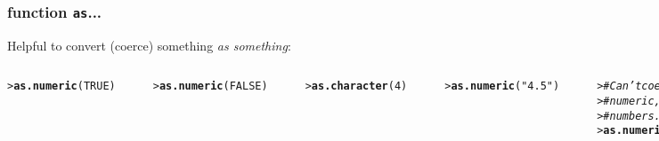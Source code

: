 \documentclass[13pt,aspectratio=169]{beamer}\usepackage[]{graphicx}\usepackage[]{color}
\makeatletter
\newcommand{\hlnum}[1]{\textcolor[rgb]{0.686,0.059,0.569}{#1}}%
\newcommand{\hlstr}[1]{\textcolor[rgb]{0.192,0.494,0.8}{#1}}%
\newcommand{\hlcom}[1]{\textcolor[rgb]{0.678,0.584,0.686}{\textit{#1}}}%
\newcommand{\hlstd}[1]{\textcolor[rgb]{0.345,0.345,0.345}{#1}}%
\newcommand{\hlkwd}[1]{\textcolor[rgb]{0.737,0.353,0.396}{\textbf{#1}}}%
\newenvironment{kframe}{%
 \def\at@end@of@kframe{}%
 \ifinner\ifhmode%
  \def\at@end@of@kframe{\end{minipage}}%
  \begin{minipage}{\columnwidth}%
 \fi\fi%
 \def\FrameCommand##1{\hskip\@totalleftmargin \hskip-\fboxsep
 \colorbox{shadecolor}{##1}\hskip-\fboxsep
     \hskip-\linewidth \hskip-\@totalleftmargin \hskip\columnwidth}%
 \MakeFramed {\advance\hsize-\width
   \@totalleftmargin\z@ \linewidth\hsize
   \@setminipage}}%
 {\par\unskip\endMakeFramed%
 \at@end@of@kframe}
\newenvironment{knitrout}{}{} %
\renewcommand{\tt}[1]{\texttt{#1}}
\renewenvironment{knitrout}{\setlength{\topsep}{0mm}}{}
\makeatother
\begin{document}
\begin{frame}[fragile]
    \frametitle{function \tt{as}...}
    Helpful to convert (coerce) something \alert{\textit{as something}}:\\
    \begin{columns}[t]
\begin{knitrout}\small
{}\color{fgcolor}\begin{kframe}
\begin{alltt}
\hlstd{> }\hlkwd{as.numeric}\hlstd{(}\hlnum{TRUE}\hlstd{)}
\end{alltt}
\begin{verbatim}
[1] 1
\end{verbatim}
\begin{alltt}
\hlstd{> }\hlkwd{as.numeric}\hlstd{(}\hlnum{FALSE}\hlstd{)}
\end{alltt}
\begin{verbatim}
[1] 0
\end{verbatim}
\begin{alltt}
\hlstd{> }\hlkwd{as.character}\hlstd{(}\hlnum{4}\hlstd{)}
\end{alltt}
\begin{verbatim}
[1] "4"
\end{verbatim}
\begin{alltt}
\hlstd{> }\hlkwd{as.numeric}\hlstd{(}\hlstr{"4.5"}\hlstd{)}
\end{alltt}
\begin{verbatim}
[1] 4.5
\end{verbatim}
\begin{alltt}
\hlstd{> }\hlcom{# Can't coerce characters to}
\hlstd{> }\hlcom{# numeric, unless they're quoted}
\hlstd{> }\hlcom{# numbers.}
\hlstd{> }\hlkwd{as.numeric}\hlstd{(}\hlstr{"Hello"}\hlstd{)}
\end{alltt}



\end{kframe}
\end{knitrout}
\end{columns}
\end{frame}
\end{document}
